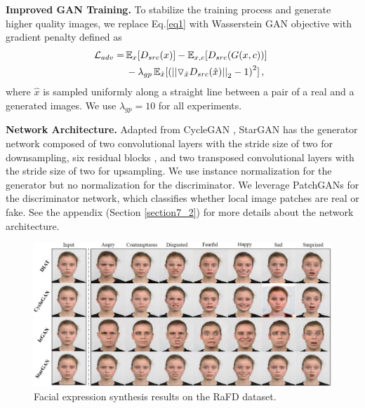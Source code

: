 \documentclass[10pt,twocolumn,letterpaper]{article}
\begin{document}
\noindent \textbf{Improved GAN Training.}
To stabilize the training process and generate higher quality images, we replace Eq.\thinspace\eqref{eq1} with Wasserstein GAN objective with gradient penalty \cite{arjovsky2017wasserstein,gulrajani2017improved} defined as
\begin{equation}
\begin{split}
\mathcal{L}_{adv} = \thinspace & {\mathbb{E}}_{x}[{D}_{src}(x)] - {\mathbb{E}}_{x, c}[{D}_{src}(G(x, c))] \thinspace \thinspace\\  
& - {\lambda}_{gp} \thinspace {\mathbb{E}}_{\hat{x}}[{{(||{\triangledown}_{\hat{x}} {D}_{src}(\hat{x})||}_{2} - 1)}^{2}] \thinspace,
\end{split}
\end{equation}
where $\hat{x}$ is sampled uniformly along a straight line between a pair of a real and a generated images. We use ${\lambda}_{gp} = 10$ for all experiments.

\medskip

\noindent \textbf{Network Architecture.}
Adapted from CycleGAN \cite{zhu2017unpaired}, StarGAN has the generator network composed of two convolutional layers with the stride size of two for downsampling, six residual blocks \cite{he2016deep}, and two transposed convolutional layers with the stride size of two for upsampling. We use instance normalization \cite{ulyanov2016instance} for the generator but no normalization for the discriminator. We leverage PatchGANs \cite{Isola_2017_CVPR,li2016precomputed,zhu2017unpaired} for the discriminator network, which classifies whether local image patches are real or fake. See the appendix (Section \ref{section7_2}) for more details about the network architecture.
\begin{figure}[ht]
\centering
\centerline{\includegraphics[width=1.0\linewidth]{images/figure5.jpg}}
\caption{Facial expression synthesis results on the RaFD dataset.}
\label{qual_rafd}
\vspace{-0.1in}  
\end{figure}
\end{document}

